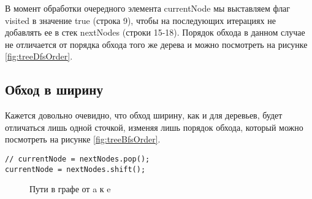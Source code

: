 \documentclass[../article.tex]{subfiles}
\begin{document}
В момент обработки очередного элемента {\firacodebold currentNode} мы выставляем флаг {\firacodebold visited} в значение {\firacodebold true} (строка 9), чтобы на последующих итерациях не добавлять ее в стек {\firacodebold nextNodes} (строки 15-18). Порядок обхода в данном случае не отличается от порядка обхода того же дерева и можно посмотреть на рисунке \ref{fig:treeDfsOrder}.

\subsection{Обход в ширину}

Кажется довольно очевидно, что обход ширину, как и для деревьев, будет отличаться лишь одной сточкой, изменяя лишь порядок обхода, который можно посмотреть на рисунке \ref{fig:treeBfsOrder}.

\begin{ruledelement}
    \begin{lstlisting}[caption={Отличие обхода в ширину от обхода в глубину}, label={lst:graphBfsDiff}]
// currentNode = nextNodes.pop();
currentNode = nextNodes.shift();
    \end{lstlisting}
\end{ruledelement}

\begin{figure}
    \caption{Пути в графе от {\firacodebold a} к {\firacodebold e}}
    \label{fig:pathExposure}
\end{figure}
\end{document}
